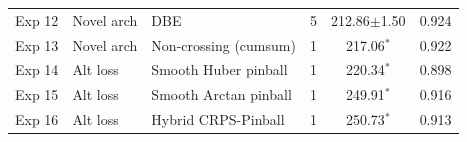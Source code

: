 \begin{table}[H]
\begin{tabular}{clllcc}
Exp 12 & Novel arch & DBE                       & 5   & 212.86$\pm$1.50  & 0.924 \\
Exp 13 & Novel arch & Non-crossing (cumsum)      & 1   & 217.06$^*$       & 0.922 \\
\midrule
Exp 14 & Alt loss   & Smooth Huber pinball       & 1   & 220.34$^*$       & 0.898 \\
Exp 15 & Alt loss   & Smooth Arctan pinball      & 1   & 249.91$^*$       & 0.916 \\
Exp 16 & Alt loss   & Hybrid CRPS-Pinball        & 1   & 250.73$^*$       & 0.913 \\
\bottomrule
\end{tabular}
\end{table}

